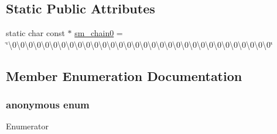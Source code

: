 \subsection*{Static Public Attributes}
\begin{DoxyCompactItemize}
\item 
static char const $\ast$ \hyperlink{classCRijndael_ac00e57b7d923c1a6f3e310203e856c9c}{sm\-\_\-chain0} = \char`\"{}\textbackslash{}0\textbackslash{}0\textbackslash{}0\textbackslash{}0\textbackslash{}0\textbackslash{}0\textbackslash{}0\textbackslash{}0\textbackslash{}0\textbackslash{}0\textbackslash{}0\textbackslash{}0\textbackslash{}0\textbackslash{}0\textbackslash{}0\textbackslash{}0\textbackslash{}0\textbackslash{}0\textbackslash{}0\textbackslash{}0\textbackslash{}0\textbackslash{}0\textbackslash{}0\textbackslash{}0\textbackslash{}0\textbackslash{}0\textbackslash{}0\textbackslash{}0\textbackslash{}0\textbackslash{}0\textbackslash{}0\textbackslash{}0\char`\"{}
\end{DoxyCompactItemize}


\subsection{Member Enumeration Documentation}
\hypertarget{classCRijndael_ac1444c814f491f48deb465ef667581d2}{\subsubsection[{anonymous enum}]{\setlength{\rightskip}{0pt plus 5cm}anonymous enum}}\label{classCRijndael_ac1444c814f491f48deb465ef667581d2}
\begin{Desc}
\item[Enumerator]\par
\begin{description}
\item[{\em 
\hypertarget{classCRijndael_ac1444c814f491f48deb465ef667581d2a45277dc10dfb5fb3b29dd622f2fa95e1}{E\-C\-B}\label{classCRijndael_ac1444c814f491f48deb465ef667581d2a45277dc10dfb5fb3b29dd622f2fa95e1}
}]\item[{\em 
\hypertarget{classCRijndael_ac1444c814f491f48deb465ef667581d2a0e8f618dfec3ca34a604ed2ec597b4be}{C\-B\-C}\label{classCRijndael_ac1444c814f491f48deb465ef667581d2a0e8f618dfec3ca34a604ed2ec597b4be}
}]\item[{\em 
\hypertarget{classCRijndael_ac1444c814f491f48deb465ef667581d2aeae0d000ef07f3925d0f8d52f5768f64}{C\-F\-B}\label{classCRijndael_ac1444c814f491f48deb465ef667581d2aeae0d000ef07f3925d0f8d52f5768f64}
}]\end{description}
\end{Desc}


